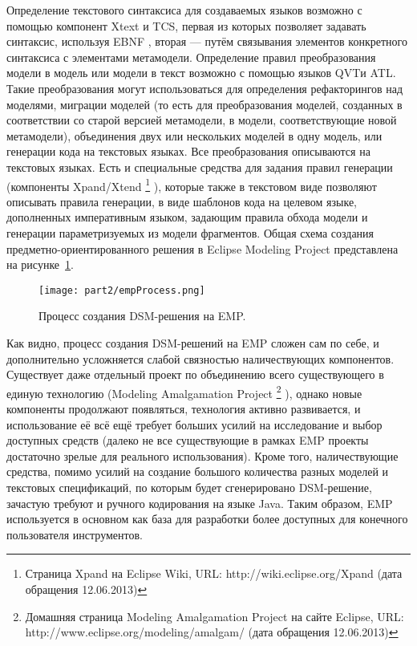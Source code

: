 Определение текстового синтаксиса для создаваемых языков возможно с помощью компонент 
Xtext и TCS, первая из которых позволяет задавать синтаксис, используя EBNF
, вторая --- путём связывания элементов конкретного синтаксиса с элементами метамодели. Определение 
правил преобразования модели в модель или модели в текст возможно с помощью языков 
QVTи ATL. Такие преобразования могут использоваться для определения рефакторингов 
над моделями, миграции моделей (то есть для преобразования моделей, созданных в соответствии 
со старой версией метамодели, в модели, соответствующие новой метамодели), объединения 
двух или нескольких моделей в одну модель, или генерации кода на текстовых языках. 
Все преобразования описываются на текстовых языках. Есть и специальные средства для задания правил генерации (компоненты Xpand/Xtend
\footnote{Страница Xpand на Eclipse Wiki, URL: http://wiki.eclipse.org/Xpand (дата обращения 12.06.2013)}
), которые также в текстовом виде позволяют описывать правила генерации, в виде шаблонов кода на целевом языке, дополненных 
императивным языком, задающим правила обхода модели и генерации параметризуемых из модели 
фрагментов. Общая схема создания предметно-ориентированного решения в Eclipse Modeling 
Project представлена на рисунке~\ref{empProcess}.

\begin{figure} [ht]
	\begin{center}
		\texttt{[image: part2/empProcess.png]}
		\caption{Процесс создания DSM-решения на EMP.}
		\label{empProcess}
	\end{center}
\end{figure}

Как видно, процесс создания DSM-решений на EMP сложен сам по себе, и дополнительно 
усложняется слабой связностью наличествующих компонентов. Существует даже отдельный 
проект по объединению всего существующего в единую технологию (Modeling Amalgamation Project
\footnote{Домашняя страница Modeling Amalgamation Project на сайте Eclipse, URL:  http://www.eclipse.org/modeling/amalgam/ (дата обращения 12.06.2013)}
), однако новые компоненты продолжают появляться, технология активно развивается, и использование 
её всё ещё требует больших усилий на исследование и выбор доступных средств (далеко 
не все существующие в рамках EMP проекты достаточно зрелые для реального использования). 
Кроме того, наличествующие средства, помимо усилий на создание большого количества 
разных моделей и текстовых спецификаций, по которым будет сгенерировано DSM-решение, 
зачастую требуют и ручного кодирования на языке Java. Таким образом, EMP используется 
в основном как база для разработки более доступных для конечного пользователя инструментов.

